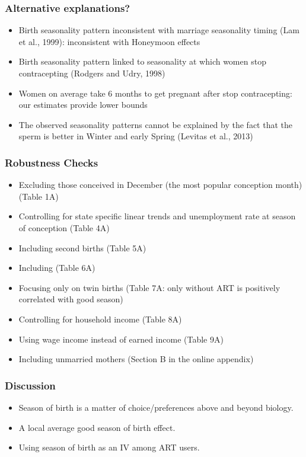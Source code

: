 \documentclass[10pt,letterpaper,subeqn]{beamer}
\begin{document}
\begin{frame}
\frametitle{Alternative explanations?}
\begin{itemize}
\item Birth seasonality pattern inconsistent with marriage seasonality timing (Lam et al., 1999): inconsistent with Honeymoon effects
\item Birth seasonality pattern linked to seasonality at which women stop contracepting (Rodgers and Udry,  1998)
\item Women on average take 6 months to get pregnant after stop contracepting: our estimates provide lower bounds
\item The observed seasonality patterns cannot be explained by the fact that the sperm is better in Winter and early Spring (Levitas et al., 2013)
\end{itemize}
\end{frame}


\begin{frame}
\hypertarget{robustness}{}
\frametitle{Robustness Checks}
\begin{itemize}
\item Excluding those conceived in December (the most popular conception month) (Table 1A)
\item Controlling for state specific linear trends and unemployment rate at season of conception (Table 4A)
\item Including second births (Table 5A)
\item Including \hyperlink{twins}{} (Table 6A)
\item Focusing only on twin births (Table 7A: only without ART is positively correlated with good season)
\item Controlling for household income (Table 8A)
\item Using wage income instead of earned income (Table 9A)
\item Including unmarried mothers (Section B in the online appendix)
\end{itemize}
\end{frame}

\begin{frame}
\frametitle{Discussion}
\begin{itemize}
\item Season of birth is a matter of choice/preferences above and beyond biology.
\item A local average good season of birth effect.
\item Using season of birth as an IV among ART users.    
\end{itemize}
\end{frame}
\end{document}
